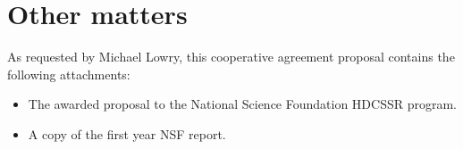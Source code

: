 
\section{Other matters}

As requested by Michael Lowry, this cooperative agreement proposal
contains the following attachments:

\begin{itemize}
\item The awarded proposal to the National Science Foundation HDCSSR
program.
\item A copy of the first year NSF report.
\end{itemize}

